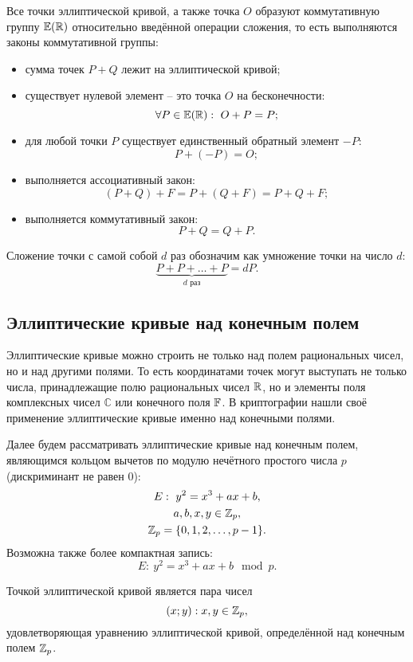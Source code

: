 Все точки эллиптической кривой, а также точка $O$ образуют коммутативную группу $\mathbb{E}(\mathbb{R})$ относительно введённой операции сложения, то есть выполняются законы коммутативной группы:
\begin{itemize}
    \item сумма точек $P + Q$ лежит на эллиптической кривой;
    \item существует нулевой элемент -- это точка $O$ на бесконечности:
        \[ \forall P \in \mathbb{E}(\mathbb{R}): ~ O + P = P; \]
    \item для любой точки $P$ существует единственный обратный элемент $-P$:
        \[ P + (-P) = O; \]
    \item выполняется ассоциативный закон:
        \[ (P + Q) + F = P + (Q + F) = P + Q + F; \]
    \item выполняется коммутативный закон:
        \[ P + Q = Q + P. \]
\end{itemize}

Сложение точки с самой собой $d$ раз обозначим как умножение точки на число $d$:
    \[ \underbrace{P + P + \ldots + P}_{d \text{ раз}} = d P. \]


\subsection{Эллиптические кривые над конечным полем}

Эллиптические кривые можно строить не только над полем рациональных чисел, но и над другими полями. То есть координатами точек могут выступать не только числа, принадлежащие полю рациональных чисел $\mathbb{R}$, но и элементы поля комплексных чисел $\mathbb{C}$ или конечного поля $\mathbb{F}$. В криптографии нашли своё применение эллиптические кривые именно над конечными полями.

Далее будем рассматривать эллиптические кривые над конечным полем, являющимся кольцом вычетов по модулю нечётного простого числа $p$ (дискриминант не равен 0):
\begin{gather*}
    E: ~ y^2 = x^3 + a x + b, \\
    a, b, x, y \in \mathbb{Z}_p, \\
   \mathbb{Z}_p = \{0, 1, 2, \ldots, p-1\}.
\end{gather*}
Возможна также более компактная запись:
    \[ E: ~ y^2 = x^3 + a x + b \mod p.\]

Точкой эллиптической кривой является пара чисел
    \[ (x; y): x, y \in \mathbb{Z}_p, \]
удовлетворяющая уравнению эллиптической кривой, определённой над конечным полем $\mathbb{Z}_p$.

